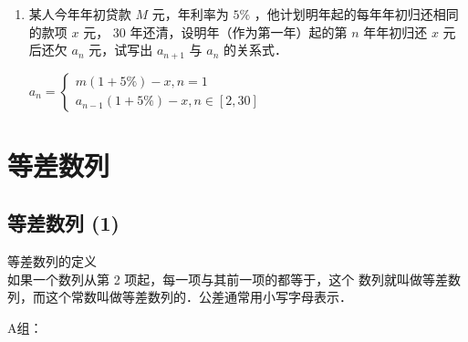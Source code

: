 \begin{enumerate}
\begin{jieda}
\begin{enumerate}
            $LHS = a^k + (1-a)^k \leq (a+1-a)^k = 1$，当且仅当$a = 0$或$1$，即$\alpha = \dfrac{m\pi}{2}, m \in \mathbf{Z}$时等号成立

            经检验，$\alpha = 2m\pi \text{或} 2m\pi + \dfrac{\pi}{2}, k \in \mathbf{Z}$时，该数列为非零常数列.
        \end{enumerate}
    \end{jieda}

\item 某人今年年初贷款 $M$ 元，年利率为 $5 \%$ ，他计划明年起的每年年初归还相同的款项 $x$ 元， 30 年还清，设明年（作为第一年）起的第 $n$ 年年初归还 $x$ 元后还欠 $a_n$ 元，试写出 $a_{n+1}$ 与 $a_n$ 的关系式．
\begin{jieda}
    $a_n=\left\{\begin{array}{l}
m(1+5 \%)-x, n=1 \\
a_{n-1}(1+5 \%)-x, n \in[2,30]
\end{array}\right.$
\end{jieda}


\end{enumerate}

\section*{等差数列}
\subsection*{等差数列 (1)}


等差数列的定义 \\
如果一个数列从第 2 项起，每一项与其前一项的都等于，这个
数列就叫做等差数列，而这个常数叫做等差数列的．公差通常用小写字母表示． 

A组：

